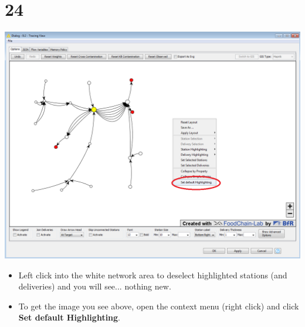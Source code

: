 \documentclass[10pt]{beamer}
\begin{document}
\section{24}
\begin{frame}
	\begin{center}
			\includegraphics[height=0.6\textheight]{24.png}
	\end{center}
	\begin{itemize}
		\item Left click into the white network area to deselect highlighted stations (and deliveries) and you will see... nothing new.
		\item To get the image you see above, open the context menu (right click) and click \textbf{Set default Highlighting}.
	\end{itemize}
\end{frame}
\end{document}
